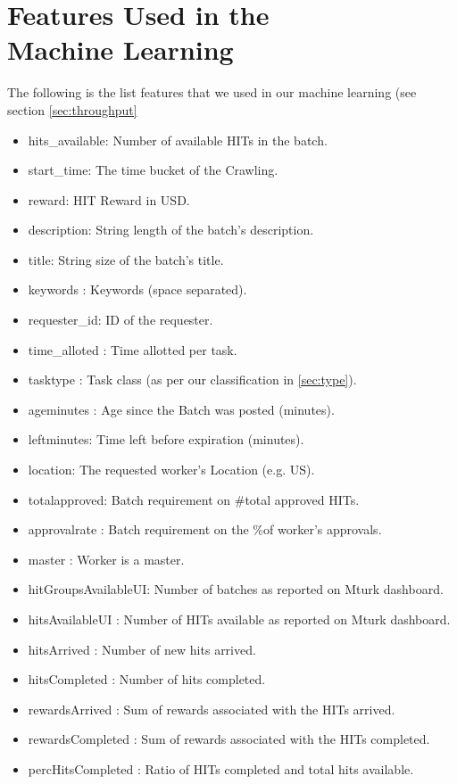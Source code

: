 \appendix
\section{Features Used in the \\ Machine Learning}
The following is the list features that we used in our machine learning (see section \ref{sec:throughput}
\begin{itemize}[noitemsep,topsep=0pt,parsep=0pt,partopsep=0pt]
\item hits\_available:  Number of available HITs in the batch.
\item start\_time:  The time bucket of the Crawling.
\item reward: HIT Reward in USD.
\item description:  String length of the batch's description.
\item title: String size of the batch's title.
\item keywords : Keywords (space separated).
\item requester\_id:   ID of the requester.
\item time\_alloted : Time allotted per task.
\item tasktype : Task class (as per our classification in \ref{sec:type}).
\item ageminutes : Age since the Batch was posted (minutes).
\item leftminutes: Time left before expiration (minutes).
\item location: The requested worker's Location (e.g. US).
\item totalapproved: Batch requirement on \#total approved HITs.
\item approvalrate : Batch requirement on the \%of worker's approvals.
\item master : Worker is a master.
\item hitGroupsAvailableUI: Number of batches as reported on Mturk dashboard.
\item hitsAvailableUI : Number of HITs available as reported on Mturk dashboard.
\item hitsArrived : Number of new hits arrived.
\item hitsCompleted : Number of hits completed.
\item rewardsArrived : Sum of rewards associated with the HITs arrived.
\item rewardsCompleted : Sum of rewards associated with the HITs completed.
\item percHitsCompleted : Ratio of HITs completed and total hits available.

\end{itemize}
